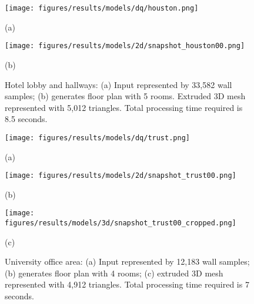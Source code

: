 \documentclass[a4paper,twoside]{article}
\begin{document}
\begin{figure}[t]
	\centering
	
	\begin{minipage}[b]{0.950\linewidth}
	\centerline{\texttt{[image: figures/results/models/dq/houston.png]}}
	\centerline{(a)}
	\end{minipage}
	\begin{minipage}[b]{0.950\linewidth}
	\centerline{\texttt{[image: figures/results/models/2d/snapshot\_houston00.png]}}
	\centerline{(b)}
	\end{minipage}

	\caption{Hotel lobby and hallways: (a) Input represented by 33,582 wall samples; (b) generates floor plan with 5 rooms. Extruded 3D mesh represented with 5,012 triangles.  Total processing time required is 8.5 seconds.}
	\label{fig:results_b}
\end{figure}

\begin{figure}[t]
	\centering
	
	\begin{minipage}[b]{0.95\linewidth}
	\centerline{\texttt{[image: figures/results/models/dq/trust.png]}}
	\centerline{(a)}
	\end{minipage}
	\hfill
	\begin{minipage}[b]{0.95\linewidth}
	\centerline{\texttt{[image: figures/results/models/2d/snapshot\_trust00.png]}}
	\centerline{(b)}
	\end{minipage}
	\hfill
	\begin{minipage}[b]{0.95\linewidth}
	\centerline{\texttt{[image: figures/results/models/3d/snapshot\_trust00\_cropped.png]}}
	\centerline{(c)}
	\end{minipage}

	\caption{University office area: (a) Input represented by 12,183 wall samples; (b) generates floor plan with 4 rooms; (c) extruded 3D mesh represented with 4,912 triangles.  Total processing time required is 7 seconds.}
	\label{fig:results_c}
\end{figure}
\end{document}
